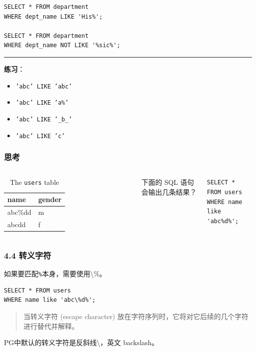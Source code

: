 \documentclass[aspectratio=169, 14pt]{beamer}
\begin{document}
\begin{frame}[fragile]
    \begin{verbatim} 
SELECT * FROM department
WHERE dept_name LIKE 'His%';

SELECT * FROM department
WHERE dept_name NOT LIKE '%sic%';
    \end{verbatim}
    \pause
    \noindent\rule{\textwidth}{1pt}
    {\large {}} \textbf{练习}：
\begin{itemize}
    \item \texttt{'abc' LIKE 'abc'}    
    \item \texttt{'abc' LIKE 'a\%'} 
    \item \texttt{'abc' LIKE '\_b\_'} 
    \item \texttt{'abc' LIKE 'c'}
\end{itemize}
\end{frame}

\begin{frame}[fragile]
    \frametitle{思考}

    \begin{columns}
        \begin{table}
            \caption*{The \texttt{users} table}
            \begin{tabular}{ll}
              \toprule
              name & gender \\
              \midrule
              abc\%dd & m \\
              abcdd & f \\
              \bottomrule
            \end{tabular}
        \end{table}
        {\large {}} 下面的 SQL 语句会输出几条结果？

        \begin{verbatim} 
SELECT *
FROM users
WHERE name like 'abc%d%';
        \end{verbatim}
    \end{columns}



\end{frame}

\begin{frame}[fragile]
    \frametitle{4.4 转义字符}
如果要匹配\texttt{\%}本身，需要使用\alert{\textbackslash\%}。
\begin{verbatim} 
SELECT * FROM users
WHERE name like 'abc\%d%';
\end{verbatim}
\begin{quote}
    当\alert{转义字符} (escape character) 放在字符序列时，它将对它后续的几个字符进行替代并解释。
\end{quote}

PG中默认的转义字符是反斜线\textbackslash，英文 backslash。
\end{frame}
\end{document}
